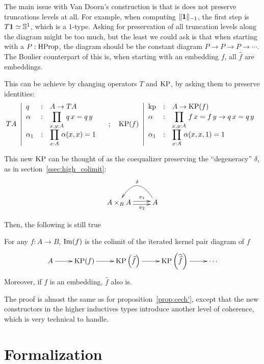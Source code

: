 The main issue with Van Doorn's construction is
that is does not preserve truncations levels at all. For example, when
computing $\|\mathbf{1}\|_{-1}$, the first step is $T\mathbf{1} \simeq \mathbb{S}^1$,
which is a $1$-type. 
Asking for preservation of all truncation levels along the diagram
might be too much, but the least we could ask is that when starting
with a $P:\operatorname{HProp}$, the diagram should be the constant diagram $P\to
P \to P\to \cdots$. The Boulier counterpart of this is, when starting
with an embedding $f$, all $\widehat f$ are embeddings. 

This can be achieve by changing operators $T$ and $\operatorname{KP}$, by asking
them to preserve identities:
\[
  TA~\left|
    \begin{array}{lll}
      q&:& A\to TA \\
      \alpha&:& \displaystyle{\prod_{x,y:A}\, q\, x = q\, y} \\
      \alpha_1&:& \displaystyle{\prod_{x:A}\, \alpha(x,x) = 1}
    \end{array}
  \right.
  \quad ; \quad
  \operatorname{KP}(f)~\left|
    \begin{array}{lll}
      \operatorname{kp}&:&A\to \operatorname{KP}(f) \\
      \alpha&:& \displaystyle{\prod_{x,y:A}\, f\, x = f\, y \to q\, x = q\, y} \\
      \alpha_1&:& \displaystyle{\prod_{x:A}\, \alpha(x,x,1) = 1}
    \end{array}    
  \right.
\]

This new $\operatorname{KP}$ can be thought of as the coequalizer preserving the
``degeneracy'' $\delta$, as in section~\ref{ssec:high_colimit}:
\[ 
  \xymatrix{
    A\times_B A \ar@<-.5ex>[r]_-{\pi_2}
    \ar@<.5ex>[r]^-{\pi_1} & A \ar@/_2pc/[l]_\delta
  }
\]

Then, the following is still true

\begin{prop}\label{prop:cech}
  For any $f:A\to B$, $\operatorname{Im}(f)$ is the colimit of the iterated kernel
  pair diagram of $f$
\[\xymatrix{
  A \ar[r] & \KP(f) \ar[r] & \KP\left(\widehat f\right) \ar[r]& \KP\left(\widehat{\widehat f}\right) \ar[r]& \cdots
}\]
Moreover, if $f$ is an embedding, $\widehat f$ also is.
\end{prop}
The proof is almost the same as for proposition~\ref{prop:cech'},
except that the new constructors in the higher inductives types
introduce another level of coherence, which is very technical to
handle.

\section{Formalization}
\label{sec:colim-formalization}

